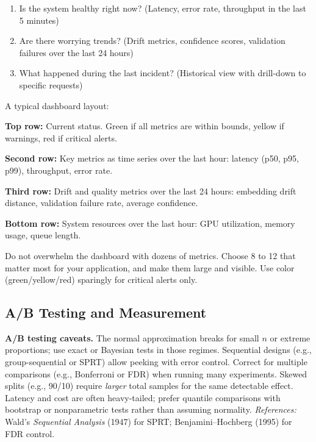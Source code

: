 \begin{enumerate}
\item Is the system healthy right now? (Latency, error rate, throughput in the last 5 minutes)
\item Are there worrying trends? (Drift metrics, confidence scores, validation failures over the last 24 hours)
\item What happened during the last incident? (Historical view with drill-down to specific requests)
\end{enumerate}

A typical dashboard layout:

\vspace{0.5em}

\textbf{Top row:} Current status. Green if all metrics are within bounds, yellow if warnings, red if critical alerts.

\textbf{Second row:} Key metrics as time series over the last hour: latency (p50, p95, p99), throughput, error rate.

\textbf{Third row:} Drift and quality metrics over the last 24 hours: embedding drift distance, validation failure rate, average confidence.

\textbf{Bottom row:} System resources over the last hour: GPU utilization, memory usage, queue length.

\vspace{0.5em}

Do not overwhelm the dashboard with dozens of metrics. Choose 8 to 12 that matter most for your application, and make them large and visible. Use color (green/yellow/red) sparingly for critical alerts only.

\vspace{1em}


\subsection{A/B Testing and Measurement}

\vspace{0.3cm}
\textbf{A/B testing caveats.} The normal approximation breaks for small $n$ or extreme proportions; use exact or Bayesian tests in those regimes. Sequential designs (e.g., group-sequential or SPRT) allow peeking with error control. Correct for multiple comparisons (e.g., Bonferroni or FDR) when running many experiments. Skewed splits (e.g., 90/10) require \emph{larger} total samples for the same detectable effect. Latency and cost are often heavy-tailed; prefer quantile comparisons with bootstrap or nonparametric tests rather than assuming normality.
\textit{References:} Wald's \emph{Sequential Analysis} (1947) for SPRT; Benjamini--Hochberg (1995) for FDR control.

